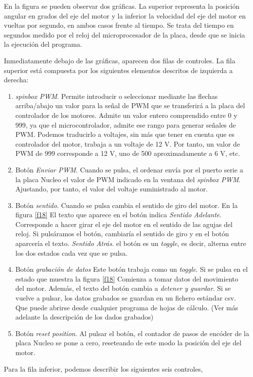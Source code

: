 \documentclass[10pt,a4paper]{report}
\begin{document}
En la figura se pueden observar dos gráficas. La superior representa la posición angular en grados del eje del motor y la inferior la velocidad del eje del motor en vueltas por segundo, en ambos casos frente al tiempo. Se trata del tiempo en segundos medido por el reloj del microprocesador de la placa, desde que se inicia la ejecución del programa.

Inmediatamente debajo de las gráficas, aparecen dos filas de controles. La fila superior está compuesta por los siguientes elementos descritos de izquierda a derecha:

\begin{enumerate}
	\item \emph{spinbox PWM}. Permite introducir o seleccionar mediante las flechas arriba/abajo un valor para la señal de PWM que se transferirá a la placa del controlador de los motores. Admite un valor entero comprendido entre 0 y 999, ya que el microcontrolador, admite ese rango para generar señales de PWM. Podemos traducirlo a voltajes, sin más que tener en cuenta que es controlador del motor, trabaja a un voltaje de 12 V. Por tanto, un valor de PWM de 999 corresponde a 12 V, uno de 500 aproximadamente a 6 V, etc.
	\item Botón \emph{Enviar PWM}. Cuando se pulsa, el ordenar envía por el puerto serie a la placa Nucleo el valor de PWM indicado en la ventana del \emph{spinbox PWM}. Ajustando, por tanto, el valor del voltaje suministrado al motor.
	\item Botón \emph{sentido}. Cuando se pulsa cambia el sentido de giro del motor. En la figura \ref{f18} El texto que aparece en el botón indica \emph{Sentido Adelante}. Corresponde a hacer girar el eje del motor en el sentido de las agujas del reloj. Si pulsáramos el botón, cambiaría el sentido de giro y en el botón aparcería el texto.  \emph{Sentido Atrás}. el botón es un \emph{toggle}, es decir, alterna entre los dos estados cada vez que se pulsa.
	\item Botón \emph{grabación de datos} Este botón trabaja como un \emph{toggle}. Si se pulsa en el estado que muestra la figura \ref{f18} Comienza a tomar datos del movimiento del motor. Además, el texto del botón cambia a \emph{detener y guardar}. Si se vuelve a pulsar, los datos grabados se guardan en un fichero estándar csv. Que puede abrirse desde cualquier programa de hojas de cálculo. (Ver más adelante la descripción de los dados grabados)
	\item Botón \emph{reset position}. Al pulsar el botón, el contador de pasos de encóder de la placa Nucleo se pone a cero, reseteando de este modo la posición del eje del motor.  
\end{enumerate}
Para la fila inferior, podemos describir los siguientes seis controles,
\end{document}
